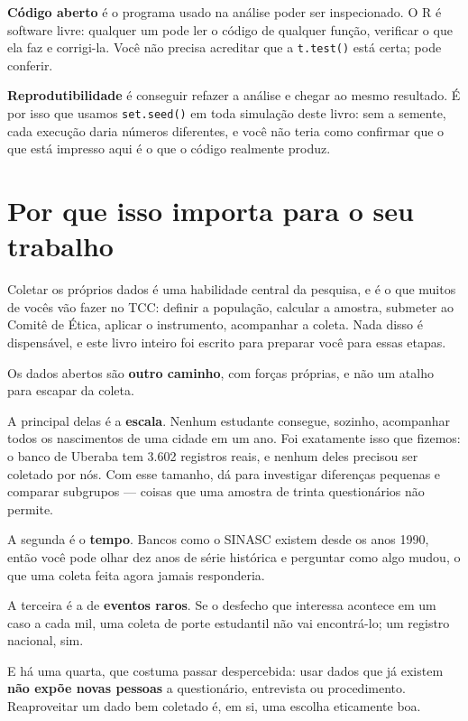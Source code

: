 \documentclass[
]{book}
\begin{document}
\textbf{Código aberto} é o programa usado na análise poder ser inspecionado. O R é software livre: qualquer um pode ler o código de qualquer função, verificar o que ela faz e corrigi-la. Você não precisa acreditar que a \texttt{t.test()} está certa; pode conferir.

\textbf{Reprodutibilidade} é conseguir refazer a análise e chegar ao mesmo resultado. É por isso que usamos \texttt{set.seed()} em toda simulação deste livro: sem a semente, cada execução daria números diferentes, e você não teria como confirmar que o que está impresso aqui é o que o código realmente produz.

\section{Por que isso importa para o seu trabalho}\label{por-que-isso-importa-para-o-seu-trabalho}

Coletar os próprios dados é uma habilidade central da pesquisa, e é o que muitos de vocês vão fazer no TCC: definir a população, calcular a amostra, submeter ao Comitê de Ética, aplicar o instrumento, acompanhar a coleta. Nada disso é dispensável, e este livro inteiro foi escrito para preparar você para essas etapas.

Os dados abertos são \textbf{outro caminho}, com forças próprias, e não um atalho para escapar da coleta.

A principal delas é a \textbf{escala}. Nenhum estudante consegue, sozinho, acompanhar todos os nascimentos de uma cidade em um ano. Foi exatamente isso que fizemos: o banco de Uberaba tem 3.602 registros reais, e nenhum deles precisou ser coletado por nós. Com esse tamanho, dá para investigar diferenças pequenas e comparar subgrupos --- coisas que uma amostra de trinta questionários não permite.

A segunda é o \textbf{tempo}. Bancos como o SINASC existem desde os anos 1990, então você pode olhar dez anos de série histórica e perguntar como algo mudou, o que uma coleta feita agora jamais responderia.

A terceira é a de \textbf{eventos raros}. Se o desfecho que interessa acontece em um caso a cada mil, uma coleta de porte estudantil não vai encontrá-lo; um registro nacional, sim.

E há uma quarta, que costuma passar despercebida: usar dados que já existem \textbf{não expõe novas pessoas} a questionário, entrevista ou procedimento. Reaproveitar um dado bem coletado é, em si, uma escolha eticamente boa.
\end{document}
